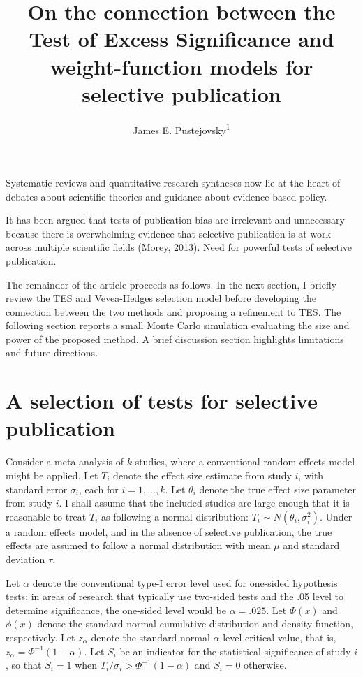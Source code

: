 \documentclass[man,floatsintext]{apa6}
\title{On the connection between the Test of Excess Significance and weight-function models for selective publication}
\author{James E. Pustejovsky\textsuperscript{1}}
\date{}
\affiliation{
\vspace{0.5cm}
\textsuperscript{1} University of Texas at Austin}
\begin{document}
\maketitle

Systematic reviews and quantitative research syntheses now lie at the heart of debates about scientific theories and guidance about evidence-based policy.

It has been argued that tests of publication bias are irrelevant and unnecessary because there is overwhelming evidence that selective publication is at work across multiple scientific fields (Morey, 2013).
Need for powerful tests of selective publication.

The remainder of the article proceeds as follows.
In the next section, I briefly review the TES and Vevea-Hedges selection model before developing the connection between the two methods and proposing a refinement to TES.
The following section reports a small Monte Carlo simulation evaluating the size and power of the proposed method.
A brief discussion section highlights limitations and future directions.

\hypertarget{tests}{%
\section{A selection of tests for selective publication}\label{tests}}

Consider a meta-analysis of \(k\) studies, where a conventional random effects model might be applied.
Let \(T_i\) denote the effect size estimate from study \(i\), with standard error \(\sigma_i\), each for \(i = 1,...,k\). Let \(\theta_i\) denote the true effect size parameter from study \(i\).
I shall assume that the included studies are large enough that it is reasonable to treat \(T_i\) as following a normal distribution: \(T_i \sim N(\theta_i, \sigma_i^2)\).
Under a random effects model, and in the absence of selective publication, the true effects are assumed to follow a normal distribution with mean \(\mu\) and standard deviation \(\tau\).

Let \(\alpha\) denote the conventional type-I error level used for one-sided hypothesis tests; in areas of research that typically use two-sided tests and the .05 level to determine significance, the one-sided level would be \(\alpha = .025\).
Let \(\Phi(x)\) and \(\phi(x)\) denote the standard normal cumulative distribution and density function, respectively.
Let \(z_\alpha\) denote the standard normal \(\alpha\)-level critical value, that is, \(z_\alpha = \Phi^{-1}(1 - \alpha)\).
Let \(S_i\) be an indicator for the statistical significance of study \(i\), so that \(S_i = 1\) when \(T_i / \sigma_i > \Phi^{-1}(1 - \alpha)\) and \(S_i = 0\) otherwise.
\end{document}
